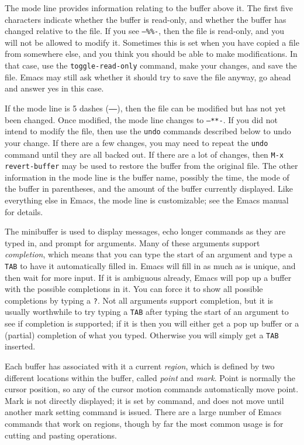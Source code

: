 The mode line provides information relating to the buffer above it.  The
first five characters indicate whether the buffer is read-only, and
whether the buffer has changed relative to the file.  If you see
\texttt{---\%\%-}, then the file is read-only, and you will not be allowed
to modify it.  Sometimes this is set when you have copied a file from
somewhere else, and you think you should be able to make modifications.
In that case, use the \texttt{toggle-read-only} command, make your
changes, and save the file.  Emacs may still ask whether it should try to
save the file anyway, go ahead and answer yes in this case.

If the mode line is 5 dashes (\texttt{-----}), then the file can be
modified but has not yet been changed.  Once modified, the mode line
changes to \texttt{--**-}.  If you did not intend to modify the file, then
use the \texttt{undo} commands described below to undo your change.  If there are a
few changes, you may need to repeat the \texttt{undo} command until they
are all backed out.  If there are a lot of changes, then \texttt{M-x
revert-buffer} may be used to restore the buffer from the original file.
The other information in the mode line is the buffer name, possibly the
time, the mode of the buffer in parentheses, and the amount of the buffer
currently displayed.  Like everything else in Emacs, the mode line is
customizable; see the Emacs manual for details.

The minibuffer is used to display messages, echo longer commands as they
are typed in, and prompt for arguments.  Many of these arguments support
\emph{completion}, which means that you can type the start of an argument
and type a \texttt{TAB} to have it automatically filled in.  Emacs will
fill in as much as is unique, and then wait for more input.  If it is
ambiguous already, Emacs will pop up a buffer with the possible
completions in it.  You can force it to show all possible completions by
typing a \texttt{?}.  Not all arguments support completion, but it is
usually worthwhile to try typing a \texttt{TAB} after typing the start of
an argument to see if completion is supported; if it is then you will
either get a pop up buffer or a (partial) completion of what you typed.
Otherwise you will simply get a \texttt{TAB} inserted.

Each buffer has associated with it a current \emph{region}, which is
defined by two different locations within the buffer, called \emph{point}
and \emph{mark}.  Point is normally the cursor position, so any of the
cursor motion commands automatically move point.  Mark is not directly
displayed; it is set by command, and does not move until another mark
setting command is issued.  There are a large number of Emacs commands
that work on regions, though by far the most common usage is for cutting
and pasting operations.

